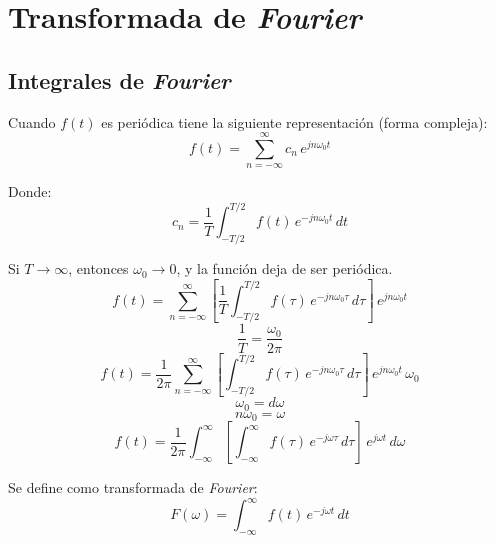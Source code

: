 \chapter{Transformada de \emph{Fourier}}

\section{Integrales de \emph{Fourier}}
\begin{figure}[H]
    \centering
    
\end{figure}

Cuando $f(t)$ es periódica tiene la siguiente representación (forma compleja):
\begin{equation*}
    f(t)=\sum_{n=-\infty}^\infty c_n\,e^{jn\omega_0 t}
\end{equation*}

Donde:
\begin{equation*}
    c_n=\frac{1}{T}\int_{-T/2}^{T/2} f(t)\,e^{-jn\omega_0 t}\,dt
\end{equation*}

Si $T\to\infty$, entonces $\omega_0\to0$, y la función deja de ser periódica.
\begin{equation*}
    f(t)=\sum_{n=-\infty}^\infty\left[
        \frac{1}{T}\int_{-T/2}^{T/2} f(\tau)\,e^{-jn\omega_0 \tau}\,d\tau
    \right]\,e^{jn\omega_0 t}
\end{equation*}
\begin{equation*}
    \frac{1}{T}=\frac{\omega_0}{2\pi}
\end{equation*}
\begin{equation*}
    f(t)=\frac{1}{2\pi}\sum_{n=-\infty}^\infty\left[
        \int_{-T/2}^{T/2} f(\tau)\,e^{-jn\omega_0 \tau}\,d\tau
    \right]\,e^{jn\omega_0 t}\,\omega_0
\end{equation*}
\begin{equation*}
    \omega_0=d\omega
\end{equation*}
\begin{equation*}
    n\omega_0=\omega
\end{equation*}
\begin{equation}
    f(t)=\frac{1}{2\pi}\int_{-\infty}^\infty\left[
        \int_{-\infty}^{\infty} f(\tau)\,e^{-j\omega\tau}\,d\tau
    \right]\,e^{j\omega t}\,d\omega
\end{equation}

Se define como transformada de \emph{Fourier}:
\begin{equation}
    F(\omega)=\int_{-\infty}^{\infty} f(t)\,e^{-j\omega t}\,dt
\end{equation}

